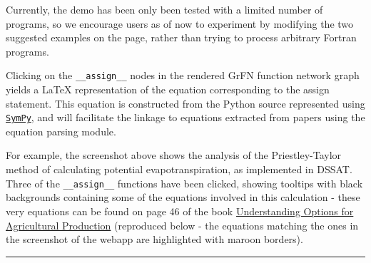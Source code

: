 \documentclass[article, 12pt, oneside]{memoir}
\begin{document}
Currently, the demo has been only been tested with a limited number of
programs, so we encourage users as of now to experiment by modifying the
two suggested examples on the page, rather than trying to process
arbitrary Fortran programs.

Clicking on the \texttt{\_\_assign\_\_} nodes in the rendered GrFN
function network graph yields a LaTeX representation of the equation
corresponding to the assign statement. This equation is constructed from
the Python source represented using
\href{https://www.sympy.org}{\texttt{SymPy}}, and will facilitate the
linkage to equations extracted from papers using the equation parsing
module.

For example, the screenshot above shows the analysis of the
Priestley-Taylor method of calculating potential evapotranspiration, as
implemented in DSSAT. Three of the \texttt{\_\_assign\_\_} functions
have been clicked, showing tooltips with black backgrounds containing
some of the equations involved in this calculation - these very
equations can be found on page 46 of the book
\href{https://link-springer-com.ezproxy2.library.arizona.edu/book/10.1007\%2F978-94-017-3624-4}{Understanding
Options for Agricultural Production} (reproduced below - the equations
matching the ones in the screenshot of the webapp are highlighted with
maroon borders).

\begin{center}\rule{0.5\linewidth}{\linethickness}\end{center}
\end{document}
